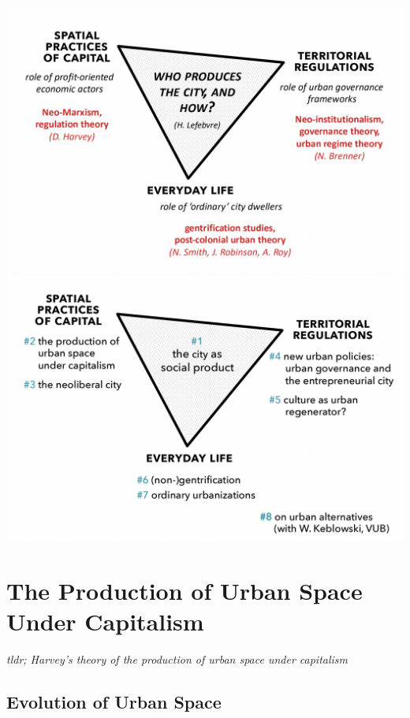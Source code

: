 \documentclass{article}
\begin{document}
\includegraphics[width=\textwidth]{map_course_organisation1}
\includegraphics[width=\textwidth]{map_course_organisation2}


\section{The Production of Urban Space Under Capitalism}
\date{October 7th, 2021}

\textit{tldr; Harvey's theory of the production of urban space under capitalism}

\subsection{Evolution of Urban Space}
\end{document}
